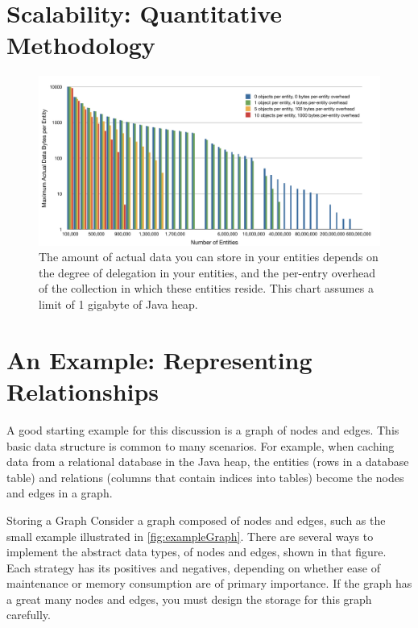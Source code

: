 \section{Scalability: Quantitative Methodology}

\begin{figure}
\centering
	\includegraphics[width=\textwidth]{part4/Figures/maxActualData}
	\caption{The amount of actual data you can store in your entities depends on
	the degree of delegation in your entities, and the per-entry overhead of the collection in which these entities
	reside. This chart assumes a limit of 1 gigabyte of Java heap.}
\end{figure}

\section{An Example: Representing Relationships}

A good starting example for this discussion is a graph of nodes and edges. This
basic data structure is common to many scenarios. For example, when caching
data from a relational database in the Java heap, the entities (rows in a
database table) and relations (columns that contain indices into tables) become
the nodes and edges in a graph.

\begin{example}{Storing a Graph}
Consider a graph composed of nodes and edges, such as the small
example illustrated in  \autoref{fig:exampleGraph}. There are several ways to
implement the abstract data types, of nodes and edges, shown in that figure.
Each strategy has its positives and negatives, depending on whether ease of
maintenance or memory consumption are of primary importance.
If the graph has a great many nodes and edges, you must design the storage
for this graph carefully.
\end{example}

